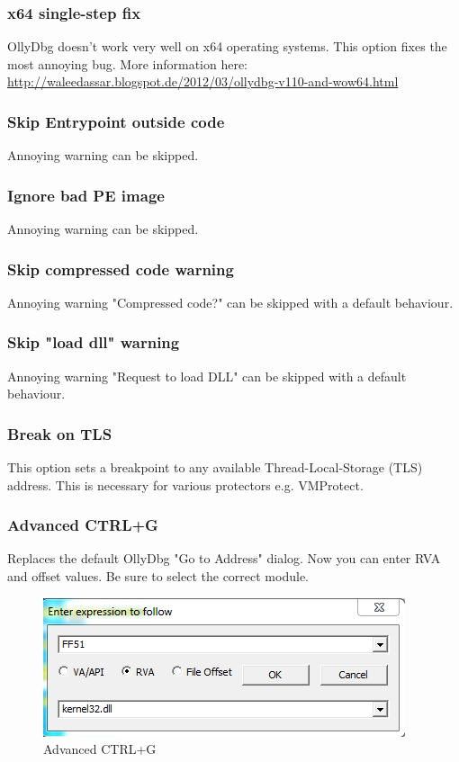 \documentclass[10pt,a4paper]{article}
\begin{document}
\subsubsection{x64 single-step fix}
OllyDbg doesn't work very well on x64 operating systems. This option fixes the most annoying bug. More information here: \url{http://waleedassar.blogspot.de/2012/03/ollydbg-v110-and-wow64.html}
\subsubsection{Skip Entrypoint outside code}
Annoying warning can be skipped.
\subsubsection{Ignore bad PE image}
Annoying warning can be skipped.
\subsubsection{Skip compressed code warning}
Annoying warning "Compressed code?" can be skipped with a default behaviour.
\subsubsection{Skip "load dll" warning}
Annoying warning "Request to load DLL" can be skipped with a default behaviour.
\subsubsection{Break on TLS}
This option sets a breakpoint to any available Thread-Local-Storage (TLS) address. This is necessary for various protectors e.g. VMProtect.
\subsubsection{Advanced CTRL+G}
Replaces the default OllyDbg "Go to Address" dialog. Now you can enter RVA and offset values. Be sure to select the correct module.

\begin{figure}[H]
\centering
\includegraphics[scale=0.8]{ollyadvancedctrlg.PNG}
\caption{Advanced CTRL+G}
\end{figure}
\end{document}
